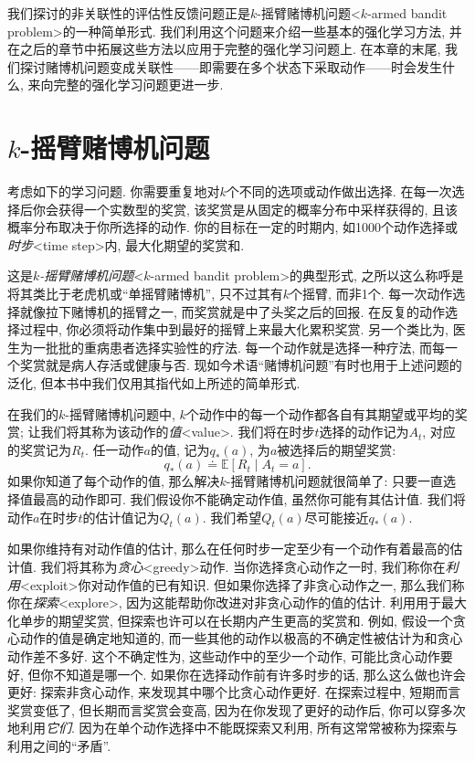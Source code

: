 我们探讨的非关联性的评估性反馈问题正是$k$-摇臂赌博机问题<$k$-armed bandit problem>的一种简单形式. 我们利用这个问题来介绍一些基本的强化学习方法, 并在之后的章节中拓展这些方法以应用于完整的强化学习问题上. 在本章的末尾, 我们探讨赌博机问题变成关联性——即需要在多个状态下采取动作——时会发生什么, 来向完整的强化学习问题更进一步.

\section{\texorpdfstring{$k$-摇臂赌博机问题}{k-摇臂赌博机问题}}\label{sec:2.1}

考虑如下的学习问题. 你需要重复地对$k$个不同的选项或动作做出选择. 在每一次选择后你会获得一个实数型的奖赏, 该奖赏是从固定的概率分布中采样获得的, 且该概率分布取决于你所选择的动作. 你的目标在一定的时期内, 如1000个动作选择或\emph{时步}<time step>内, 最大化期望的奖赏和.

这是$k$\emph{-摇臂赌博机问题}<$k$-armed bandit problem>的典型形式, 之所以这么称呼是将其类比于老虎机或``单摇臂赌博机'', 只不过其有$k$个摇臂, 而非1个. 每一次动作选择就像拉下赌博机的摇臂之一, 而奖赏就是中了头奖之后的回报. 在反复的动作选择过程中, 你必须将动作集中到最好的摇臂上来最大化累积奖赏. 另一个类比为, 医生为一批批的重病患者选择实验性的疗法. 每一个动作就是选择一种疗法, 而每一个奖赏就是病人存活或健康与否. 现如今术语``赌博机问题''有时也用于上述问题的泛化, 但本书中我们仅用其指代如上所述的简单形式.

在我们的$k$-摇臂赌博机问题中, $k$个动作中的每一个动作都各自有其期望或平均的奖赏; 让我们将其称为该动作的\emph{值}<value>. 我们将在时步$t$选择的动作记为$A_t$, 对应的奖赏记为$R_t$. 任一动作$a$的值, 记为$q_*(a)$, 为$a$被选择后的期望奖赏:
\begin{equation*}
q_*(a) \doteq \mathbb E [R_t \mid A_t = a].
\end{equation*}
如果你知道了每个动作的值, 那么解决$k$-摇臂赌博机问题就很简单了: 只要一直选择值最高的动作即可. 我们假设你不能确定动作值, 虽然你可能有其估计值. 我们将动作$a$在时步$t$的估计值记为$Q_t(a)$. 我们希望$Q_t(a)$尽可能接近$q_*(a)$.

如果你维持有对动作值的估计, 那么在任何时步一定至少有一个动作有着最高的估计值. 我们将其称为\emph{贪心}<greedy>动作. 当你选择贪心动作之一时, 我们称你在\emph{利用}<exploit>你对动作值的已有知识. 但如果你选择了非贪心动作之一, 那么我们称你在\emph{探索}<explore>, 因为这能帮助你改进对非贪心动作的值的估计. 利用用于最大化单步的期望奖赏, 但探索也许可以在长期内产生更高的奖赏和. 例如, 假设一个贪心动作的值是确定地知道的, 而一些其他的动作以极高的不确定性被估计为和贪心动作差不多好. 这个不确定性为, 这些动作中的至少一个动作, 可能比贪心动作要好, 但你不知道是哪一个. 如果你在选择动作前有许多时步的话, 那么这么做也许会更好: 探索非贪心动作, 来发现其中哪个比贪心动作更好. 在探索过程中, 短期而言奖赏变低了, 但长期而言奖赏会变高, 因为在你发现了更好的动作后, 你可以穿多次地利用\emph{它们}. 因为在单个动作选择中不能既探索又利用, 所有这常常被称为探索与利用之间的``矛盾''.


